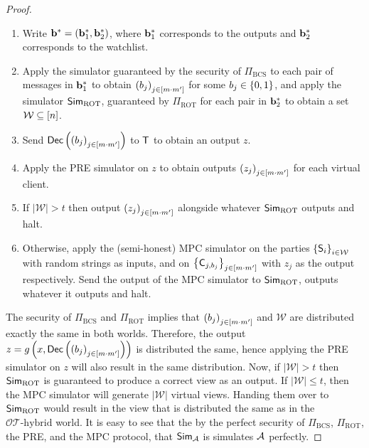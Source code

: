 \documentclass{llncs}
\newcommand{\OTfunc}{\mathcal{OT}}
\newcommand{\OThybrid}{\OTfunc\mbox{-}\text{hybrid}}
\newcommand{\rampOT}{\operatorname{ROT}}
\newcommand{\ROT}{\operatorname{ROT}}
\newcommand{\stb}{\operatorname{BCS}}
\newcommand{\W}{\mathcal{W}}
\renewcommand{\b}{\myvec{b}}
\renewcommand{\Sc}{\mathsf{S}}
\newcommand{\Cc}{\mathsf{C}}
\renewcommand{\Dec}{\mathsf{Dec}}
\begin{document}
\begin{proof}
\begin{enumerate}
    \item Write $\b^*=(\b^*_1,\b^*_2)$, where $\b^*_1$ corresponds to the outputs and $\b^*_2$ corresponds to the watchlist.
    
    \item Apply the simulator guaranteed by the security of $\Pi_{\stb}$ to each pair of messages in $\b^*_1$ to obtain $\left ( b_{j} \right )_{j\in[m\cdot m']}$ for some $b_j\in\{0,1\}$, and apply the simulator $\Sim_{\ROT}$, guaranteed by $\Pi_{\rampOT}$ for each pair in $\b^*_2$ to obtain a set $\W\su[n]$.
    
    \item Send $\Dec\of{\vect{b_{j}}_{j\in[m\cdot m']}}$ to $\mathsf{T}$ to obtain an output $z$.
    
    \item Apply the PRE simulator on $z$ to obtain outputs $\left ( z_j \right )_{j\in[m\cdot m']}$ for each virtual client.
    
    \item If $|\W|>t$ then output $\left ( z_j \right )_{j\in[m\cdot m']}$ alongside whatever $\Sim_{\ROT}$ outputs and halt.
    
    \item Otherwise, apply the (semi-honest) MPC simulator on the parties $\set{\Sc_i}_{i\in\W}$ with random strings as inputs, and on $\set{\Cc_{j,b_j}}_{j\in[m\cdot m']}$ with $z_j$ as the output respectively. Send the output of the MPC simulator to $\Sim_{\ROT}$, outputs whatever it outputs and halt.
\end{enumerate}

\ifdefined\IsFV
The security of $\Pi_{\stb}$ and $\Pi_{\ROT}$ implies that $\left ( b_{j} \right )_{j\in[m\cdot m']}$ and $\W$ are distributed exactly the same in both worlds. Therefore, the output $z=g\of{x,\Dec\of{\vect{b_{j}}_{j\in[m\cdot m']}}}$ is distributed the same, hence applying the PRE simulator on $z$ will also result in the same distribution. Now, if $|\W|>t$ then $\Sim_{\ROT}$ is guaranteed to produce a correct view as an output. If $|\W|\leq t$, then the MPC simulator will generate $|\W|$ virtual views. Handing them over to $\Sim_{\ROT}$ would result in the view that is distributed the same as in the $\OThybrid$ world.
\else
It is easy to see that the by the perfect security of $\Pi_{\stb}$, $\Pi_{\ROT}$, the PRE, and the MPC protocol, that $\mathsf{Sim}_{\mathcal{A}}$ is simulates $\mathcal{A}$ perfectly.
\fi
{}
\end{proof}
\end{document}
